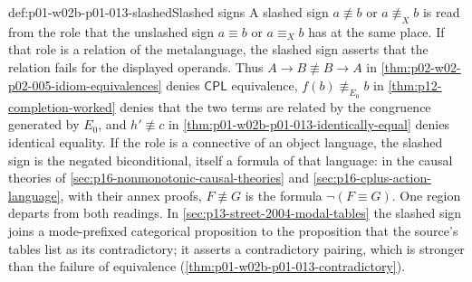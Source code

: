 \begin{hbconvention}{def:p01-w02b-p01-013-slashed}{Slashed signs}
A slashed sign \(a\not\equiv b\) or \(a\not\equiv_X b\) is read from the
role that the unslashed sign \(a\equiv b\) or \(a\equiv_X b\) has at the same
place.  If that role is a relation of the metalanguage, the slashed sign
asserts that the relation fails for the displayed operands.  Thus
\(A\to B\not\equiv B\to A\) in \cref{thm:p02-w02-p02-005-idiom-equivalences}
denies \(\mathsf{CPL}\) equivalence, \(f(b)\not\equiv_{E_0}b\) in
\cref{thm:p12-completion-worked} denies that the two terms are related by
the congruence generated by \(E_0\), and \(h'\not\equiv c\) in
\cref{thm:p01-w02b-p01-013-identically-equal} denies identical equality.
If the role is a connective of an object language, the slashed sign is the
negated biconditional, itself a formula of that language: in the causal
theories of \cref{sec:p16-nonmonotonic-causal-theories} and
\cref{sec:p16-cplus-action-language}, with their annex proofs,
\(F\not\equiv G\) is the formula \(\neg(F\equiv G)\).  One region departs
from both readings.  In \cref{sec:p13-street-2004-modal-tables} the
slashed sign joins a mode-prefixed categorical proposition to the
proposition that the source's tables list as its contradictory; it asserts
a contradictory pairing, which is stronger than the failure of equivalence
(\cref{thm:p01-w02b-p01-013-contradictory}).
\end{hbconvention}

